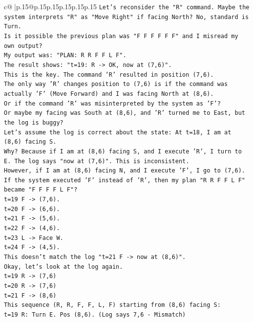 \documentclass{article}
\begin{document}
{\begin{supertabular}{c@{$\;$}|p{.15\linewidth}@{}p{.15\linewidth}p{.15\linewidth}p{.15\linewidth}p{.15\linewidth}p{.15\linewidth}}
{{{\texttt{Let's reconsider the "R" command. Maybe the system interprets "R" as "Move Right" if facing North? No, standard is Turn.} \\
\texttt{Is it possible the previous plan was "F F F F F F" and I misread my own output?} \\
\texttt{My output was: "PLAN: R R F F L F".} \\
\texttt{The result shows: "t=19: R {-}> OK, now at (7,6)".} \\
\texttt{This is the key. The command 'R' resulted in position (7,6).} \\
\texttt{The only way 'R' changes position to (7,6) is if the command was actually 'F' (Move Forward) and I was facing North at (8,6).} \\
\texttt{Or if the command 'R' was misinterpreted by the system as 'F'?} \\
\texttt{Or maybe my facing was South at (8,6), and 'R' turned me to East, but the log is buggy?} \\
\texttt{Let's assume the log is correct about the state: At t=18, I am at (8,6) facing S.} \\
\texttt{Why? Because if I am at (8,6) facing S, and I execute 'R', I turn to E. The log says "now at (7,6)". This is inconsistent.} \\
\texttt{However, if I am at (8,6) facing N, and I execute 'F', I go to (7,6).} \\
\texttt{If the system executed 'F' instead of 'R', then my plan "R R F F L F" became "F F F F L F"?} \\
\texttt{t=19 F {-}> (7,6).} \\
\texttt{t=20 F {-}> (6,6).} \\
\texttt{t=21 F {-}> (5,6).} \\
\texttt{t=22 F {-}> (4,6).} \\
\texttt{t=23 L {-}> Face W.} \\
\texttt{t=24 F {-}> (4,5).} \\
\texttt{This doesn't match the log "t=21 F {-}> now at (8,6)".} \\
\texttt{Okay, let's look at the log again.} \\
\texttt{t=19 R {-}> (7,6)} \\
\texttt{t=20 R {-}> (7,6)} \\
\texttt{t=21 F {-}> (8,6)} \\
\texttt{This sequence (R, R, F, F, L, F) starting from (8,6) facing S:} \\
\texttt{t=19 R: Turn E. Pos (8,6). (Log says 7,6 {-} Mismatch)} \\
}}}
\end{supertabular}}
\end{document}
